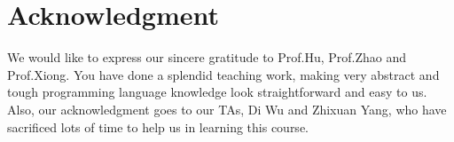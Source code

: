 \section{Acknowledgment}
\label{acknowledgment}

We would like to express our sincere gratitude to Prof.Hu, Prof.Zhao and Prof.Xiong. You have done a splendid teaching work, making very abstract and tough programming language knowledge look straightforward and easy to us. Also, our acknowledgment goes to our TAs, Di Wu and Zhixuan Yang, who have sacrificed lots of time to help us in learning this course.